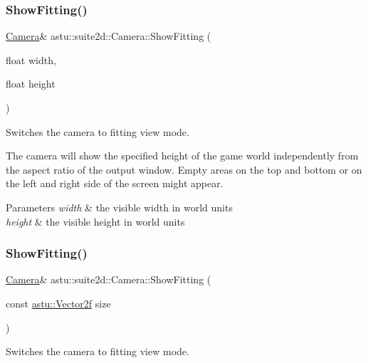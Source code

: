 \subsubsection{\texorpdfstring{Show\+Fitting()}{ShowFitting()}\hspace{0.1cm}{\footnotesize\ttfamily [1/2]}}
{\footnotesize\ttfamily \hyperlink{classastu_1_1suite2d_1_1Camera}{Camera}\& astu\+::suite2d\+::\+Camera\+::\+Show\+Fitting (\begin{DoxyParamCaption}\item[{float}]{width,  }\item[{float}]{height }\end{DoxyParamCaption})}

Switches the camera to fitting view mode.

The camera will show the specified height of the game world independently from the aspect ratio of the output window. Empty areas on the top and bottom or on the left and right side of the screen might appear.


\begin{DoxyParams}{Parameters}
{\em width} & the visible width in world units \\
\hline
{\em height} & the visible height in world units \\
\hline
\end{DoxyParams}
\mbox{\label{classastu_1_1suite2d_1_1Camera_a191692f6b99f00380cc0660ce155086a}} 
\subsubsection{\texorpdfstring{Show\+Fitting()}{ShowFitting()}\hspace{0.1cm}{\footnotesize\ttfamily [2/2]}}
{\footnotesize\ttfamily \hyperlink{classastu_1_1suite2d_1_1Camera}{Camera}\& astu\+::suite2d\+::\+Camera\+::\+Show\+Fitting (\begin{DoxyParamCaption}\item[{const \hyperlink{classastu_1_1Vector2}{astu\+::\+Vector2f}}]{size }\end{DoxyParamCaption})\hspace{0.3cm}{\ttfamily [inline]}}

Switches the camera to fitting view mode.

